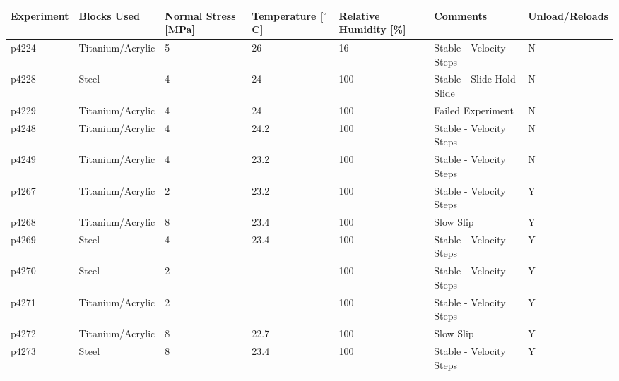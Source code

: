 \documentclass[11pt]{article}
\begin{document}
\small
\begin{center}
    \begin{tabular}{ | l l p{1.6cm} p{1.7cm} p{1.6cm} p{4cm} p{0.5cm} | }
\hline
Experiment & Blocks Used & Normal Stress [MPa] & Temperature [$^\circ$C] & Relative Humidity [\%] & Comments & Unload/Reloads \\
\hline
p4224      & Titanium/Acrylic & 5                   & 26              & 16                    & Stable - Velocity Steps         & N              \\
p4228      & Steel            & 4                   & 24              & 100                   & Stable - Slide Hold Slide       & N              \\
p4229      & Titanium/Acrylic & 4                   & 24              & 100                   & Failed Experiment               & N              \\
p4248      & Titanium/Acrylic & 4                   & 24.2            & 100                   & Stable - Velocity Steps         & N              \\
p4249      & Titanium/Acrylic & 4                   & 23.2            & 100                   & Stable - Velocity Steps         & N              \\
p4267      & Titanium/Acrylic & 2                   & 23.2            & 100                   & Stable - Velocity Steps         & Y              \\
p4268      & Titanium/Acrylic & 8                   & 23.4            & 100                   & Slow Slip                       & Y              \\
p4269      & Steel            & 4                   & 23.4            & 100                   & Stable - Velocity Steps         & Y              \\
p4270      & Steel            & 2                   &                 & 100                   & Stable - Velocity Steps         & Y              \\
p4271      & Titanium/Acrylic & 2                   &                 & 100                   & Stable - Velocity Steps         & Y              \\
p4272      & Titanium/Acrylic & 8                   & 22.7            & 100                   & Slow Slip                       & Y              \\
p4273      & Steel            & 8                   & 23.4            & 100                   & Stable - Velocity Steps         & Y              \\

\end{tabular}
\end{center}
\end{document}
